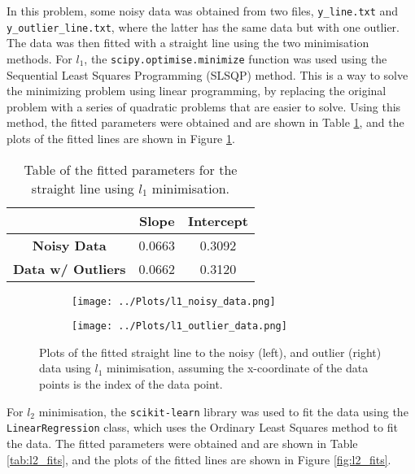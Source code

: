 \documentclass[12pt]{report} %
\begin{document}
In this problem, some noisy data was obtained from two files, \texttt{y\_line.txt} and \texttt{y\_outlier\_line.txt}, where the latter has the same data but with one outlier. The data was then fitted with a straight line using the two minimisation methods. For $l_{1}$, the \texttt{scipy.optimise.minimize} function was used using the Sequential Least Squares Programming (SLSQP) method. This is a way to solve the minimizing problem using linear programming, by replacing the original problem with a series of quadratic problems that are easier to solve\cite{mathse_slsqp}. Using this method, the fitted parameters were obtained and are shown in Table \ref{tab:l1_fits}, and the plots of the fitted lines are shown in Figure \ref{fig:l1_fits}.

\begin{table}
    \begin{center}
        \begin{tabular}{ccc}
            \hline
            & \textbf{Slope} & \textbf{Intercept} \\
            \hline
            \textbf{Noisy Data} & 0.0663 & 0.3092 \\
            \textbf{Data w/ Outliers} & 0.0662 & 0.3120 \\
            \hline
        \end{tabular}
        \caption{Table of the fitted parameters for the straight line using $l_{1}$ minimisation.}
        \label{tab:l1_fits}
    \end{center}
\end{table}

\begin{figure}[htbp]
    \centering
    \begin{subfigure}[b]{0.45\textwidth}
        \texttt{[image: ../Plots/l1\_noisy\_data.png]}
    \end{subfigure}
    \hfill
    \begin{subfigure}[b]{0.45\textwidth}
        \texttt{[image: ../Plots/l1\_outlier\_data.png]}
    \end{subfigure}
    \caption{Plots of the fitted straight line to the noisy (left), and outlier (right) data using $l_{1}$ minimisation, assuming the x-coordinate of the data points is the index of the data point.}
    \label{fig:l1_fits}
\end{figure}

For $l_{2}$ minimisation, the \texttt{scikit-learn} library was used to fit the data using the \texttt{LinearRegression} class, which uses the Ordinary Least Squares method to fit the data\cite{sklearn_linear_regression}. The fitted parameters were obtained and are shown in Table \ref{tab:l2_fits}, and the plots of the fitted lines are shown in Figure \ref{fig:l2_fits}.
\end{document}
